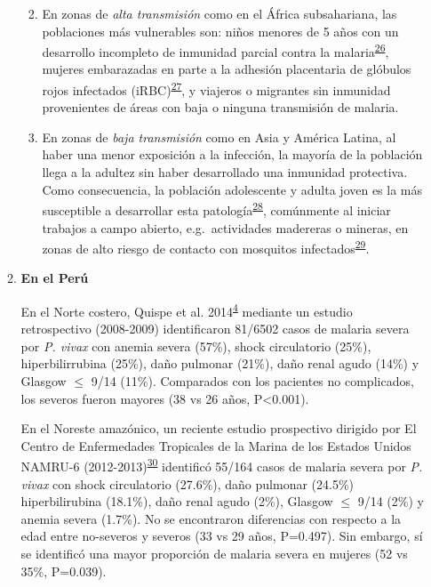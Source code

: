 \documentclass[a4paper]{article}
\providecommand{\tightlist}{%
  \setlength{\itemsep}{0pt}\setlength{\parskip}{0pt}}
\begin{document}
\begin{enumerate}
\begin{enumerate}
    \begin{enumerate}
    \def\labelenumiii{\arabic{enumiii}.}
    \tightlist
    \item
      En zonas de \emph{alta transmisión} como en el África
      subsahariana, las poblaciones más vulnerables son: niños menores
      de 5 años con un desarrollo incompleto de inmunidad parcial contra
      la
      malaria\textsuperscript{\protect\hyperlink{ref-Stanisic2015}{26}},
      mujeres embarazadas en parte a la adhesión placentaria de glóbulos
      rojos infectados
      (iRBC)\textsuperscript{\protect\hyperlink{ref-rogerson2007preg}{27}},
      y viajeros o migrantes sin inmunidad provenientes de áreas con
      baja o ninguna transmisión de malaria.
    \item
      En zonas de \emph{baja transmisión} como en Asia y América Latina,
      al haber una menor exposición a la infección, la mayoría de la
      población llega a la adultez sin haber desarrollado una inmunidad
      protectiva. Como consecuencia, la población adolescente y adulta
      joven es la más susceptible a desarrollar esta
      patología\textsuperscript{\protect\hyperlink{ref-llanoschea2015}{28}},
      comúnmente al iniciar trabajos a campo abierto, e.g.~actividades
      madereras o mineras, en zonas de alto riesgo de contacto con
      mosquitos
      infectados\textsuperscript{\protect\hyperlink{ref-factores2001}{29}}.
    \end{enumerate}
  \item
    \textbf{En el Perú}

    En el Norte costero, Quispe et al.
    2014\textsuperscript{\protect\hyperlink{ref-quispe2014}{4}} mediante
    un estudio retrospectivo (2008-2009) identificaron 81/6502 casos de
    malaria severa por \emph{P. vivax} con anemia severa (57\%), shock
    circulatorio (25\%), hiperbilirrubina (25\%), daño pulmonar (21\%),
    daño renal agudo (14\%) y Glasgow \(\le\) 9/14 (11\%). Comparados
    con los pacientes no complicados, los severos fueron mayores (38 vs
    26 años, P\textless{}0.001).

    En el Noreste amazónico, un reciente estudio prospectivo dirigido
    por El Centro de Enfermedades Tropicales de la Marina de los Estados
    Unidos NAMRU-6
    (2012-2013)\textsuperscript{\protect\hyperlink{ref-smith2013}{30}}
    identificó 55/164 casos de malaria severa por \emph{P. vivax} con
    shock circulatorio (27.6\%), daño pulmonar (24.5\%) hiperbilirubina
    (18.1\%), daño renal agudo (2\%), Glasgow \(\le\) 9/14 (2\%) y
    anemia severa (1.7\%). No se encontraron diferencias con respecto a
    la edad entre no-severos y severos (33 vs 29 años, P=0.497). Sin
    embargo, sí se identificó una mayor proporción de malaria severa en
    mujeres (52 vs 35\%, P=0.039).
  \end{enumerate}
\end{enumerate}
\end{document}
